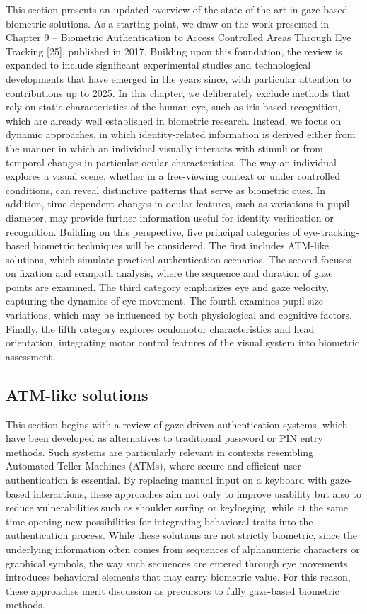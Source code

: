 \documentclass{article}
\begin{document}
This section presents an updated overview of the state of the art in gaze-based biometric solutions.
As a starting point, we draw on the work presented in Chapter 9 – Biometric Authentication to Access Controlled Areas Through Eye Tracking [25], published in 2017. 
Building upon this foundation, the review is expanded to include significant experimental studies and technological developments that have emerged in the years since, with particular attention to contributions up to 2025.
In this chapter, we deliberately exclude methods that rely on static characteristics of the human eye, such as iris-based recognition, which are already well established in biometric research. 
Instead, we focus on dynamic approaches, in which identity-related information is derived either from the manner in which an individual visually interacts with stimuli or from temporal changes in particular ocular characteristics.
The way an individual explores a visual scene, whether in a free-viewing context or under controlled conditions, can reveal distinctive patterns that serve as biometric cues.
In addition, time-dependent changes in ocular features, such as variations in pupil diameter, may provide further information useful for identity verification or recognition.
Building on this perspective, five principal categories of eye-tracking-based biometric techniques will be considered. 
The first includes ATM-like solutions, which simulate practical authentication scenarios.
The second focuses on fixation and scanpath analysis, where the sequence and duration of gaze points are examined. 
The third category emphasizes eye and gaze velocity, capturing the dynamics of eye movement. 
The fourth examines pupil size variations, which may be influenced by both physiological and cognitive factors.
Finally, the fifth category explores oculomotor characteristics and head orientation, integrating motor control features of the visual system into biometric assessment.

\subsection{ATM-like solutions}

This section begins with a review of gaze-driven authentication systems, which have been developed as alternatives to traditional password or PIN entry methods.
Such systems are particularly relevant in contexts resembling Automated Teller Machines (ATMs), where secure and efficient user authentication is essential. 
By replacing manual input on a keyboard with gaze-based interactions, these approaches aim not only to improve usability but also to reduce vulnerabilities such as shoulder surfing or keylogging, while at the same time opening new possibilities for integrating behavioral traits into the authentication process.
While these solutions are not strictly biometric, since the underlying information often comes from sequences of alphanumeric characters or graphical symbols, the way such sequences are entered through eye movements introduces behavioral elements that may carry biometric value.
For this reason, these approaches merit discussion as precursors to fully gaze-based biometric methods.
\end{document}
